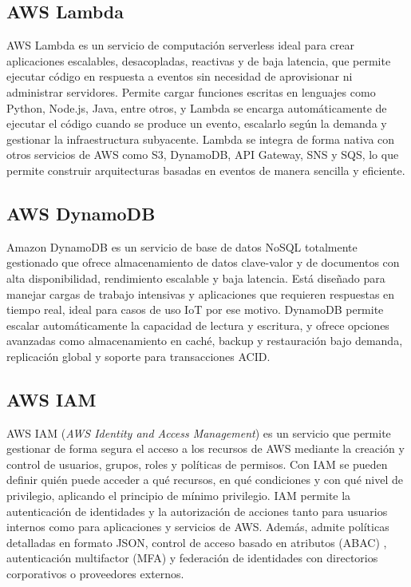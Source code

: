 \subsection{AWS Lambda}
AWS Lambda \citep{aws_lambda} es un servicio de computación serverless ideal para crear aplicaciones escalables, desacopladas, reactivas y de baja latencia, que permite ejecutar código en respuesta a eventos sin necesidad de aprovisionar ni administrar servidores. Permite cargar funciones escritas en lenguajes como Python, Node.js, Java, entre otros, y Lambda se encarga automáticamente de ejecutar el código cuando se produce un evento, escalarlo según la demanda y gestionar la infraestructura subyacente. Lambda se integra de forma nativa con otros servicios de AWS como S3, DynamoDB, API Gateway, SNS y SQS, lo que permite construir arquitecturas basadas en eventos de manera sencilla y eficiente. 


\subsection{AWS DynamoDB}
Amazon DynamoDB \citep{aws_dynamodb} es un servicio de base de datos NoSQL totalmente gestionado que ofrece almacenamiento de datos clave-valor y de documentos con alta disponibilidad, rendimiento escalable y baja latencia. Está diseñado para manejar cargas de trabajo intensivas y aplicaciones que requieren respuestas en tiempo real, ideal para casos de uso IoT por ese motivo. DynamoDB permite escalar automáticamente la capacidad de lectura y escritura, y ofrece opciones avanzadas como almacenamiento en caché, backup y restauración bajo demanda, replicación global y soporte para transacciones ACID. 

\subsection{AWS IAM}
AWS IAM (\textit{AWS Identity and Access Management}) \citep{aws_iam} es un servicio que permite gestionar de forma segura el acceso a los recursos de AWS mediante la creación y control de usuarios, grupos, roles y políticas de permisos. Con IAM se pueden definir quién puede acceder a qué recursos, en qué condiciones y con qué nivel de privilegio, aplicando el principio de mínimo privilegio. IAM permite la autenticación de identidades y la autorización de acciones tanto para usuarios internos como para aplicaciones y servicios de AWS. Además, admite políticas detalladas en formato JSON, control de acceso basado en atributos (ABAC) \citep{abac}, autenticación multifactor (MFA) \citep{mfa} y federación de identidades con directorios corporativos o proveedores externos.


